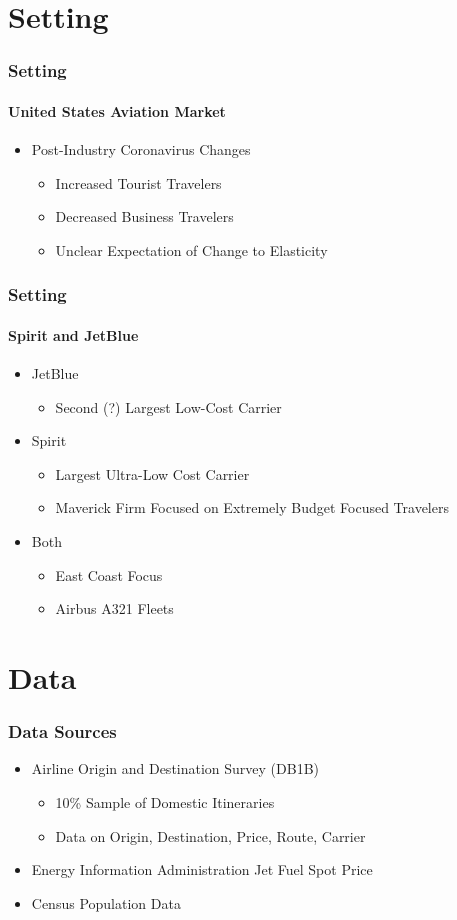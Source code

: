 \documentclass[xcolor=dvipsnames]{beamer}
\begin{document}
	\section{Setting}
	\begin{frame}
		\frametitle{Setting}
		\framesubtitle{United States Aviation Market}
		\begin{itemize}
			\item Post-Industry Coronavirus Changes
			\begin{itemize}
				\item Increased Tourist Travelers 
				\item Decreased Business Travelers
				\item Unclear Expectation of Change to Elasticity
			\end{itemize}
		\end{itemize} 
	\end{frame}



	\begin{frame}
		\frametitle{Setting}
		\framesubtitle{Spirit and JetBlue}
			\begin{itemize}
			\item JetBlue 
			\begin{itemize}
				\item Second (?) Largest Low-Cost Carrier
			\end{itemize}
			\item Spirit 
			\begin{itemize}
				\item Largest Ultra-Low Cost Carrier
				\item Maverick Firm Focused on Extremely Budget Focused Travelers 
			\end{itemize}
			\item Both 
			\begin{itemize}
	 		\item East Coast Focus
	 		\item Airbus A321 Fleets
			\end{itemize}
		\end{itemize} 
	\end{frame}

	\section{Data}
	\begin{frame}
		\frametitle{Data Sources}
		\begin{itemize}
			\item Airline Origin and Destination Survey (DB1B)
			\begin{itemize}
				\item 10\% Sample of Domestic Itineraries 
				\item Data on Origin, Destination, Price, Route, Carrier
			\end{itemize}
			\item Energy Information Administration Jet Fuel Spot Price
			\item Census Population Data
		\end{itemize}
	\end{frame}
	
\end{document}
